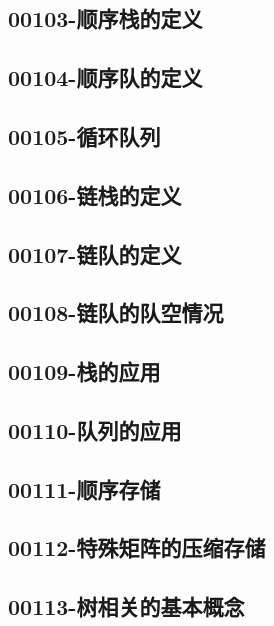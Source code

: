 \subsection{00103-顺序栈的定义}

\subsection{00104-顺序队的定义}

\subsection{00105-循环队列}

\subsection{00106-链栈的定义}

\subsection{00107-链队的定义}

\subsection{00108-链队的队空情况}

\subsection{00109-栈的应用}

\subsection{00110-队列的应用}

\subsection{00111-顺序存储}

\subsection{00112-特殊矩阵的压缩存储}

\subsection{00113-树相关的基本概念}

